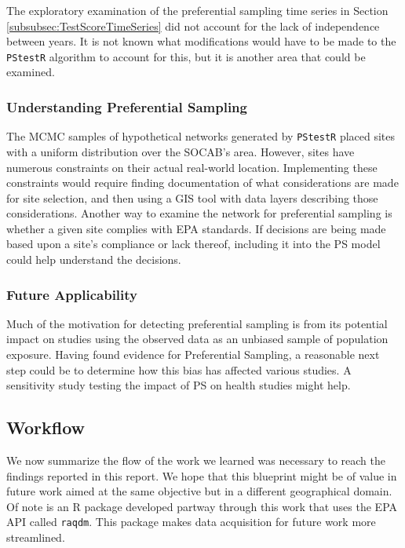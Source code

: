 \documentclass{article}
\begin{document}
The exploratory examination of the preferential sampling time series in Section \ref{subsubsec:TestScoreTimeSeries} did not account for the lack of independence between years.  It is not known what modifications would have to be made to the \texttt{PStestR} algorithm to account for this, but it is another area that could be examined.
 
\subsubsection*{Understanding Preferential Sampling}
\label{subsubsec:understandingPF}

The MCMC samples of hypothetical networks generated by \texttt{PStestR} placed sites with a uniform distribution over the SOCAB's area.  However, sites have numerous constraints on their actual real-world location.  Implementing these constraints would require finding documentation of what considerations are made for site selection, and then using a GIS tool with data layers describing those considerations.  Another way to examine the network for preferential sampling is whether a given site complies with \ac{EPA} standards.  If decisions are being made based upon a site's compliance or lack thereof, including it into the \ac{PS} model could help understand the decisions.

\subsubsection*{Future Applicability}
\label{subsubsec:futureapps}
Much of the motivation for detecting preferential sampling is from its potential impact on studies using the observed data as an unbiased sample of population exposure.  Having found evidence for Preferential Sampling, a reasonable next step could be to determine how this bias has affected various studies.  A sensitivity study testing the impact of \ac{PS} on health studies might help.

\subsection{Workflow}
\label{subsec:workflow}
We now summarize the flow of the work we learned was necessary to reach the findings reported in this report. We hope that this blueprint might be of value in future work aimed at the same objective but in a different geographical domain.  Of note is an R package developed partway through this work that uses the EPA API called \texttt{raqdm}.  This package makes data acquisition for future work more streamlined.
\end{document}
